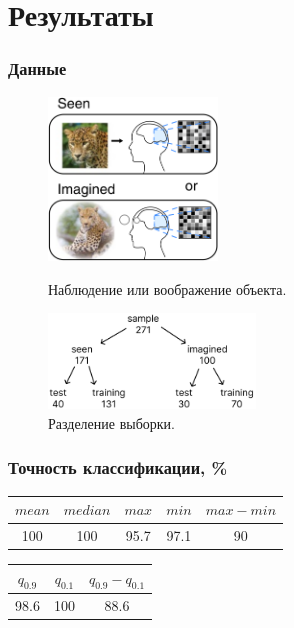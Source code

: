 \documentclass{beamer}
\begin{document}
	\section{Результаты}
	\begin{frame} 
		\frametitle{Данные}
		\begin{figure}
			\begin{minipage}{4.5cm}
				\includegraphics[width=4.5cm]{../images/data_1.png}
				\caption{Наблюдение или воображение объекта.} 
				\label{fg:12}
			\end{minipage}\hfill
			\begin{minipage}{5.5cm}
				\includegraphics[width=5.5cm]{../images/data_2.pdf}
				\caption{Разделение выборки.}
				\label{fg:13}
			\end{minipage}	
		\end{figure}
	\end{frame}

	\begin{frame} 
		\frametitle{Точность классификации, \%}
		\vspace{1cm}
		
		\begin{table}
			\begin{tabular}{ccccc}
				$mean$ & $median$ & $max$ & $min$ & $max - min$ \\ \hline
				100 & 100 & 95.7 & 97.1 & 90
			\end{tabular}
		\end{table}
	
		\begin{table}
			\begin{tabular}{ccc}
				$q_{0.9}$ & $q_{0.1}$ & $q_{0.9} - q_{0.1}$ \\ \hline
				98.6 & 100 & 88.6
			\end{tabular}
		\end{table}
	
	
		

	\end{frame}
		
		
\end{document}
